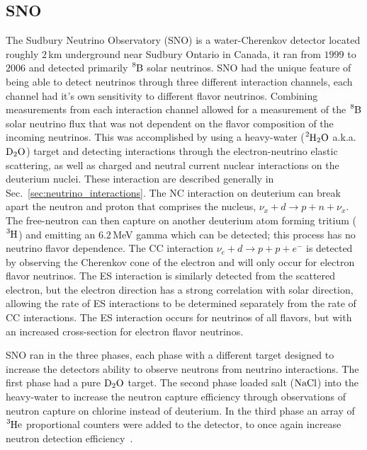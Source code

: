 \subsection{SNO}
\label{sec:sno}
The Sudbury Neutrino Observatory (SNO) is a water-Cherenkov detector located
roughly $2$\,km underground near Sudbury Ontario in Canada, it ran from
$1999$ to $2006$ and detected primarily $\ce{^{8}B}$ solar neutrinos.
SNO had the unique feature of
being able to detect neutrinos through three different interaction channels,
each channel had it's own sensitivity to different flavor neutrinos.
Combining measurements from each interaction channel allowed for a measurement of the $\ce{^{8}B}$
solar neutrino flux that was not dependent on the flavor composition of the
incoming neutrinos.
This was accomplished by using a heavy-water ($\ce{^{2}H_{2}O}$ a.k.a. $\ce{D_{2}O}$) target and
detecting interactions through the electron-neutrino elastic scattering,
as well as charged and neutral current nuclear interactions on the deuterium
nuclei.
These interaction are described generally in Sec.~\ref{sec:neutrino_interactions}.
The NC interaction on deuterium can break apart the neutron and proton
that comprises the nucleus, $\nu_{x} + d \rightarrow p + n + \nu_{x}$.
The free-neutron can then capture on another deuterium atom forming tritium ($\ce{^{3}H}$)
and emitting an $6.2$\,MeV gamma which can be detected;
this process has no neutrino flavor dependence.
The CC interaction $\nu_{e} + d \rightarrow p + p + e^{-}$
is detected by observing the Cherenkov cone of the electron and will only
occur for electron flavor neutrinos.
The ES interaction is similarly detected from the scattered electron,
but the electron direction has a strong correlation with solar direction,
allowing the rate of ES interactions to be determined separately from the
rate of CC interactions.
The ES interaction occurs for neutrinos of all flavors, but with an increased
cross-section for electron flavor neutrinos.

SNO ran in the three phases, each phase with a different target
designed to increase the detectors ability to observe neutrons from neutrino
interactions.
The first phase had a pure $\ce{D_{2}O}$ target.
 The second phase loaded salt ($\ce{NaCl}$) into the heavy-water to increase
the neutron capture efficiency through observations of neutron capture on
chlorine instead of deuterium.
In the third phase an array of $\ce{^{3}He}$ proportional counters were added
to the detector, to once again increase neutron detection efficiency~\citep{sno_review}.

